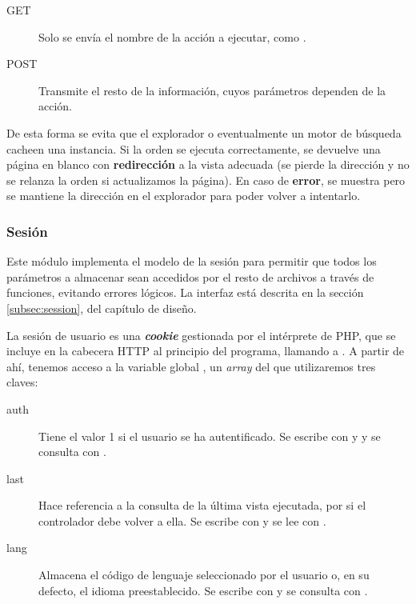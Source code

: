 \begin{description}
	\item[GET] Solo se envía el nombre de la acción a ejecutar, como .
	\item[POST] Transmite el resto de la información, cuyos parámetros dependen de la acción.
\end{description}

De esta forma se evita que el explorador o eventualmente un motor de búsqueda cacheen una instancia. Si la orden se ejecuta correctamente, se devuelve una página en blanco con \textbf{redirección} a la vista adecuada (se pierde la dirección y no se relanza la orden si actualizamos la página). En caso de \textbf{error}, se muestra pero se mantiene la dirección en el explorador para poder volver a intentarlo.

\subsubsection{Sesión}

Este módulo implementa el modelo de la sesión para permitir que todos los parámetros a almacenar sean accedidos por el resto de archivos a través de funciones, evitando errores lógicos. La interfaz está descrita en la sección \ref{subsec:session}, del capítulo de diseño.

La sesión de usuario es una \textbf{\textit{cookie}} gestionada por el intérprete de \acrshort{PHP}, que se incluye en la cabecera \acrshort{HTTP} al principio del programa, llamando a . A partir de ahí, tenemos acceso a la variable global , un \textit{array} del que utilizaremos tres claves:

\begin{description}
	\item[auth] Tiene el valor 1 si el usuario se ha autentificado. Se escribe con  y  y se consulta con .
	
	\item[last] Hace referencia a la consulta de la última vista ejecutada, por si el controlador debe volver a ella. Se escribe con  y se lee con .
	
	\item[lang] Almacena el código de lenguaje seleccionado por el usuario o, en su defecto, el idioma preestablecido. Se escribe con  y se consulta con .
\end{description}

